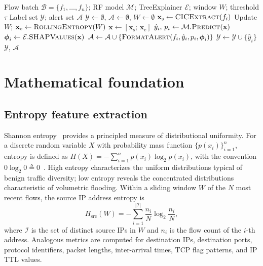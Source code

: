 ﻿\documentclass[journal]{IEEEtran}
\begin{document}
\begin{algorithm}[!t]
\caption{XAI-SDN real-time detection and explanation}
\label{alg:xaisdn}
\begin{algorithmic}[1]
\Require Flow batch $\mathcal{B}=\{f_1,\ldots,f_n\}$; RF model $\mathcal{M}$; TreeExplainer $\mathcal{E}$; window $W$; threshold $\tau$
\Ensure Label set $\mathcal{Y}$; alert set $\mathcal{A}$
\State $\mathcal{Y}\leftarrow\emptyset$,\; $\mathcal{A}\leftarrow\emptyset$,\; $W\leftarrow\emptyset$
\State $\mathbf{x}_{\mathrm{s}} \leftarrow \textsc{CICExtract}(f_i)$ 
\State Update $W$;\; $\mathbf{x}_{\mathrm{e}} \leftarrow \textsc{RollingEntropy}(W)$ 
\State $\mathbf{x} \leftarrow [\mathbf{x}_{\mathrm{s}};\, \mathbf{x}_{\mathrm{e}}]$ 
\State $\hat{y}_i,\, p_i \leftarrow \mathcal{M}.\textsc{Predict}(\mathbf{x})$ 
\State $\boldsymbol{\phi}_i \leftarrow \mathcal{E}.\textsc{SHAPValues}(\mathbf{x})$ 
\State $\mathcal{A}\leftarrow\mathcal{A}\cup\{\textsc{FormatAlert}(f_i,\hat{y}_i,p_i,\boldsymbol{\phi}_i)\}$
\EndIf
\State $\mathcal{Y}\leftarrow\mathcal{Y}\cup\{\hat{y}_i\}$
\EndFor
\State \Return $\mathcal{Y}$,\; $\mathcal{A}$
\end{algorithmic}
\end{algorithm}

\section{Mathematical foundation}
\label{sec:math}

\subsection{Entropy feature extraction}
Shannon entropy~\cite{shannon1948mathematical} provides a principled measure of distributional uniformity. For a discrete random variable $X$ with probability mass function $\{p(x_i)\}_{i=1}^{n}$, entropy is defined as $H(X) = -\sum_{i=1}^{n} p(x_i) \log_2 p(x_i)$, with the convention $0\log_2 0 \triangleq 0$~\cite{nychis2008entropy}. High entropy characterizes the uniform distributions typical of benign traffic diversity; low entropy reveals the concentrated distributions characteristic of volumetric flooding. Within a sliding window $W$ of the $N$ most recent flows, the source IP address entropy is
\begin{equation}
H_{\mathrm{src}}(W) = -\sum_{i=1}^{|\mathcal{I}|} \frac{n_i}{N} \log_2 \frac{n_i}{N},
\label{eq:srcip}
\end{equation}
where $\mathcal{I}$ is the set of distinct source IPs in $W$ and $n_i$ is the flow count of the $i$-th address. Analogous metrics are computed for destination IPs, destination ports, protocol identifiers, packet lengths, inter-arrival times, TCP flag patterns, and IP TTL values.
\end{document}
